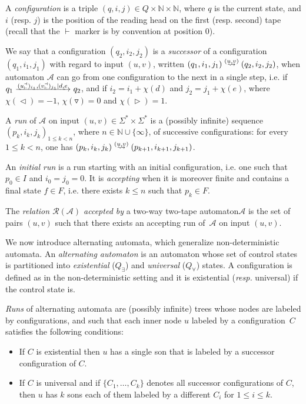 \documentclass[runningheads, envcountsame, a4paper]{llncs}
\newcommand*{\N}{\mathbb{N}}
\newcommand*{\ie}{i.e.\xspace}
\newcommand*{\resp}{\emph{resp.}\xspace}
\newcommand*{\bmark}{\vdash}
\newcommand*{\emark}{\dashv}
\newcommand*{\alphabet}{\Sigma}
\newcommand*{\atm}{\mathcal{A}}
\newcommand*{\states}{Q}
\newcommand*{\init}{I}
\newcommand*{\final}{F}
\newcommand*{\goleft}{\vartriangleleft}
\newcommand*{\goright}{\vartriangleright}
\newcommand*{\stay}{\triangledown}
\newcommand*{\eword}[1]{{#1}^\emark_\bmark}
\newcommand*{\model}{two-way two-tape automaton\xspace}
\newcommand*{\wordsof}[1]{{#1}^*}
\newcommand*{\words}{\wordsof{\alphabet}}
\newcommand*{\adaptarrow}[2][]{\mathchoice
         {\xrightarrow{#2}_{#1}}
         {\xrightarrow{\smash{\lower1pt\hbox{$\scriptstyle #2$}}}_{#1}}
         {\text{Erreur}}
         {\text{Erreur}}}
\newcommand*{\instruction}[4]{{#1}, {#2} \mid {#3}, {#4}}
\newcommand*{\transition}[7][]{#2 \adaptarrow[#1]{\instruction{#3}{#4}{#5}{#6}} #7}
\newcommand*{\xleadsto}[1]{\overset{#1}{\leadsto}}
\newcommand*{\xadaptleadsto}[1]{\mathchoice
         {\xleadsto{#1}}
         {\xleadsto{\smash{\lower1pt\hbox{$\scriptstyle #1$}}}}
         {\text{Erreur}}
         {\text{Erreur}}}
\newcommand*{\succconf}[3][]{#2 \xadaptleadsto{#1} #3}
\newcommand*{\rela}[1]{\mathcal{R}\left(#1\right)}
\begin{document}
A \emph{configuration} is a triple $(q, i, j) \in \states \times \N \times
\N$, where $q$ is the current state, and $i$ (resp. $j$) is the position of
the reading head on the first (resp. second) tape (recall that the $\bmark$
marker is by convention at position $0$).

We say that a configuration $(q_2, i_2, j_2)$ is a \emph{successor} of a
configuration $(q_1, i_1, j_1)$ with regard to input $(u, v)$, written
$\succconf[(u,v)]{(q_1, i_1, j_1)}{(q_2, i_2, j_2)}$, when automaton
$\atm$ can go from one configuration to the next in a single step, \ie if
$\transition{q_1}{(\eword{u})_{i_1}}{(\eword{v})_{j_1}}{d}{e}{q_2}$,
and if $i_2 = i_1 + \chi(d)$ and $j_2 = j_1 + \chi(e)$, where
$\chi(\goleft) = -1$, $\chi(\stay) = 0$ and $\chi(\goright) = 1$.

A \emph{run} of $\atm$ on input $(u, v) \in \words \times \words$ is a
(possibly infinite) sequence $(p_k, i_k, j_k)_{1 \leq k < n}$, where $n \in
\N \cup \{\infty\}$, of successive configurations: for every $1 \leq k <
n$, one has $\succconf[(u,v)]{(p_k, i_k, j_k)}{(p_{k+1}, i_{k+1},
  j_{k+1})}$.

An \emph{initial run} is a run starting with an initial configuration, \ie
one such that $p_0 \in \init$ and $i_0 = j_0 = 0$.  It is \emph{accepting}
when it is moreover finite and contains a final state $f \in \final$, \ie
there exists $k \leq n$ such that $ p_k \in \final$.

The \emph{relation $\rela{\atm}$ accepted by} a \model $\atm$ is the set of
pairs $(u,v)$ such that there exists an accepting run of~$\atm$ on input
$(u,v)$.

We now introduce alternating automata, which generalize non-deterministic
automata. An \emph{alternating automaton} is an automaton whose set of
control states is partitioned into \emph{existential} ($Q_\exists$) and
\emph{universal} ($Q_\forall$) states. A configuration is defined as in the
non-deterministic setting and it is existential (\resp universal) if the
control state is.

\emph{Runs} of alternating automata are (possibly infinite) trees whose
nodes are labeled by configurations, and such that each inner node $u$
labeled by a configuration~$C$ satisfies the following conditions:
\begin{itemize} 
\item If $C$ is existential then $u$ has a single son that is
  labeled by a successor configuration of $C$.
\item If $C$ is universal and if $\{C_1,\dots,C_k\}$ denotes all successor
  configurations of $C$, then $u$ has $k$ sons each of them labeled by a
  different $C_i$ for $1\leq i\leq k$.
\end{itemize}
\end{document}
